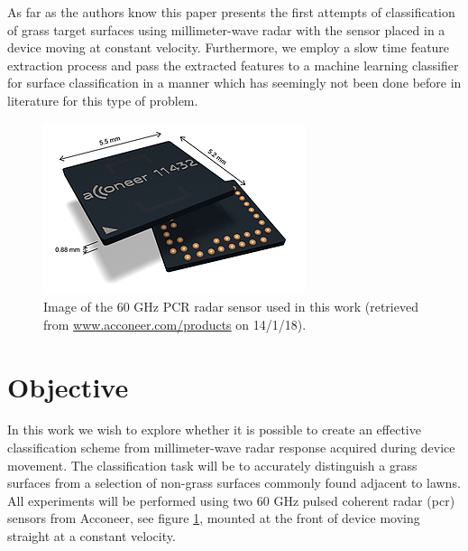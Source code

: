 
As far as the authors know this paper presents the first attempts of classification of grass target surfaces using millimeter-wave radar with the sensor placed in a device moving at constant velocity. Furthermore, we employ a slow time feature extraction process and pass the extracted features to a machine learning classifier for surface classification in a manner which has seemingly not been done before in literature for this type of problem. 

\begin{figure}
	\centering
	\includegraphics[scale=0.8]{figs_temp/acc_sensor}
	\caption{Image of the 60 GHz PCR radar sensor used in this work (retrieved from \url{www.acconeer.com/products} on 14/1/18).}
	\label{fig:acc_sens}
\end{figure}

\section{Objective}

In this work we wish to explore whether it is possible to create an effective classification scheme from millimeter-wave radar response acquired during device movement. The classification task will be to accurately distinguish a grass surfaces from a selection of non-grass surfaces commonly found adjacent to lawns. All experiments will be performed using two 60 GHz pulsed coherent radar (\gls{pcr}) sensors from Acconeer, see figure \ref{fig:acc_sens}, mounted at the front of device moving straight at a constant velocity. 



